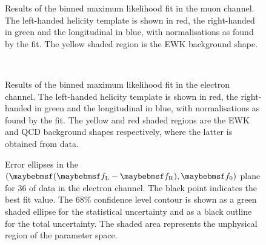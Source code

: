 \begin{figure}
\centering
{}\quad
{}
\caption[Results of the binned maximum likelihood fit - muons]{Results of the
  binned maximum likelihood fit in the muon channel. The left-handed helicity
  template is shown in red, the right-handed in green and the longitudinal in
  blue, with normalisations as found by the fit. The yellow shaded region is
  the \ac{EWK} background shape.}
\label{fig:wpol_fit_results_mu}
\end{figure}

\begin{figure}
\centering
{}\quad
{}\\
\caption[Results of the binned maximum likelihood fit - electrons]{Results of
  the binned maximum likelihood fit in the electron channel. The left-handed
  helicity template is shown in red, the right-handed in green and the
  longitudinal in blue, with normalisations as found by the fit. The yellow and
  red shaded regions are the \ac{EWK} and \ac{QCD} background shapes
  respectively, where the latter is obtained from data.}
\label{fig:wpol_fit_results_ele}
\end{figure}



\begin{figure}
\centering
{}\quad
{}
\caption[Error ellipses in the $(\fLmfR, \f0)$ plane for the electron
channel]{Error ellipses in the $(\fLmfR, \f0)$ plane for \unit{36}{\invpb} of
  data in the electron channel. The black point indicates the best fit
  value. The 68\% confidence level contour is shown as a green shaded ellipse
  for the statistical uncertainty and as a black outline for the total
  uncertainty. The shaded area represents the unphysical region of the parameter
  space.}
\label{fig:wpol_contour_ele}
\end{figure}

